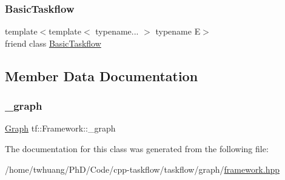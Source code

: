 \subsubsection{\texorpdfstring{Basic\+Taskflow}{BasicTaskflow}}
{\footnotesize\ttfamily template$<$template$<$ typename... $>$ typename E$>$ \\
friend class \hyperlink{classtf_1_1BasicTaskflow}{Basic\+Taskflow}\hspace{0.3cm}{\ttfamily [friend]}}



\subsection{Member Data Documentation}
\mbox{\label{classtf_1_1Framework_a935110e9ab91f5a520f9354409892d20}} 
\subsubsection{\texorpdfstring{\+\_\+graph}{\_graph}}
{\footnotesize\ttfamily \hyperlink{namespacetf_a2afa7da139285640eaf8122535136dc9}{Graph} tf\+::\+Framework\+::\+\_\+graph\hspace{0.3cm}{\ttfamily [protected]}}



The documentation for this class was generated from the following file\+:\begin{DoxyCompactItemize}
\item 
/home/twhuang/\+Ph\+D/\+Code/cpp-\/taskflow/taskflow/graph/\hyperlink{framework_8hpp}{framework.\+hpp}\end{DoxyCompactItemize}

